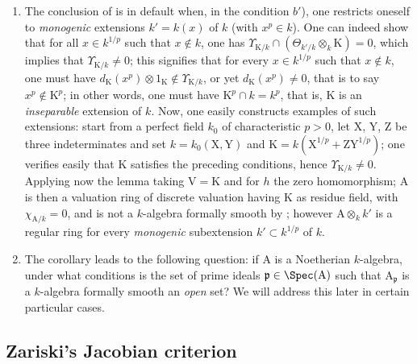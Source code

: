 \begin{remark}[22.5.10]
\label{0.22.5.10}
\begin{enumerate}
  \item[\rm{(i)}] The conclusion of  is in default when, in the condition $b'$), one restricts oneself to \emph{monogenic} extensions $k'=k(x)$ of $k$ (with $x^p\in k$).
  One can indeed show that for all $x\in k^{1/p}$ such that $x\notin k$, one has $\Upsilon_{\mathrm{K}/k}\cap(\Theta_{k'/k}\otimes_k\mathrm{K})=0$, which implies that $\Upsilon_{\mathrm{K}/k}\neq 0$; this signifies that for every $x\in k^{1/p}$ such that $x\notin k$, one must have $d_\mathrm{K}(x^p)\otimes 1_\mathrm{K}\notin\Upsilon_{\mathrm{K}/k}$, or yet $d_\mathrm{K}(x^p)\neq 0$, that is to say $x^p\notin\mathrm{K}^p$; in other words, one must have $\mathrm{K}^p\cap k=k^p$, that is, $\mathrm{K}$ is an \emph{inseparable} extension of $k$.
  Now, one easily constructs examples of such extensions: start from a perfect field $k_0$ of characteristic $p>0$, let $\mathrm{X}$, $\mathrm{Y}$, $\mathrm{Z}$ be three indeterminates and set $k=k_0(\mathrm{X},\mathrm{Y})$ and $\mathrm{K}=k(\mathrm{X}^{1/p}+\mathrm{Z}\mathrm{Y}^{1/p})$; one verifies easily that $\mathrm{K}$ satisfies the preceding conditions, hence $\Upsilon_{\mathrm{K}/k}\neq 0$.
  Applying now the lemma  taking $\mathrm{V}=\mathrm{K}$ and for $h$ the zero homomorphism; $\mathrm{A}$ is then a valuation ring of discrete valuation having $\mathrm{K}$ as residue field, with $\chi_{\mathrm{A}/k}=0$, and is not a $k$-algebra formally smooth by ; however $\mathrm{A}\otimes_kk'$ is a regular ring for every \emph{monogenic} subextension $k'\subset k^{1/p}$ of $k$.
  \item[\rm{(ii)}] The corollary  leads to the following question: if $\mathrm{A}$ is a Noetherian $k$-algebra, under what conditions is the set of prime ideals $\mathfrak{p}\in\Spec(\mathrm{A})$ such that $\mathrm{A}_\mathfrak{p}$ is a $k$-algebra formally smooth an \emph{open} set?
  We will address this later in certain particular cases.
\end{enumerate}
\end{remark}

\subsection{Zariski's Jacobian criterion}
\label{subsection:0.22.6}

